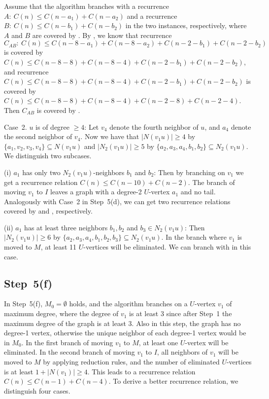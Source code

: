 \documentclass{elsart_TR2}
\begin{document}
Assume that the algorithm branches with
a recurrence $A:~C(n)\leq C(n-a_1)+C(n-a_2)$ and
a recurrence $B:~C(n)\leq C(n-b_1)+C(n-b_2)$ in the two instances, respectively,
where $A$ and $B$ are covered by .
By , we know that
recurrence $C_{AB}:~C(n)\leq C(n-8-a_1)+C(n-8-a_2)+C(n-2-b_1)+C(n-2-b_2)$ is covered by $C(n)\leq C(n-8-8)+C(n-8-4)+C(n-2-b_1)+C(n-2-b_2)$, and
recurrence
$C(n)\leq C(n-8-8)+C(n-8-4)+C(n-2-b_1)+C(n-2-b_2)$ is covered by $C(n)\leq C(n-8-8)+C(n-8-4)+C(n-2-8)+C(n-2-4)$.
Then $C_{AB}$ is covered by .




Case~2. $u$ is of degree $\geq 4$: Let $v_4$ denote the fourth neighbor of $u$,
 and $a_4$ denote the second neighbor of $v_4$.
Now we have that $|N(v_1u)|\geq 4$ by $\{a_1,v_2,v_3,v_4\}\subseteq N(v_1u)$ and $|N_2(v_1u)|\geq 5$
by $\{a_2,a_3,a_4,b_1,b_2\}\subseteq N_2(v_1u)$.
We distinguish two subcases.

(i) $a_1$ has only two $N_2(v_1u)$-neighbors $b_1$ and $b_2$:
Then by branching on $v_1$
we get a recurrence relation $C(n)\leq C(n-10)+C(n-2)$.
The branch of moving $v_1$ to $I$ leaves a graph with a degree-2 $U$-vertex $a_1$ and no tail.
Analogously with Case~2 in Step~5(d),
we can get two recurrence relations covered by  and , respectively.

(ii) $a_1$ has at least three neighbors $b_1,b_2$ and $b_3\in N_2(v_1u)$:
Then $|N_2(v_1u)|\geq 6$ by $\{a_2,a_3,a_4,b_1,b_2,b_3\}\subseteq N_2(v_1u)$.
In the branch where $v_1$ is moved to $M$, at least 11 $U$-vertices will be eliminated.
We can branch with  in this case.

\subsection{Step~5(f)}
In Step~5(f), $M_0=\emptyset$ holds, and
the algorithm branches on a $U$-vertex $v_1$ of maximum degree,
where the degree of $v_1$ is  at least 3 since after Step~1 the maximum degree of the graph is at least 3.
Also in this step, the graph has no degree-1 vertex, otherwise the unique neighbor of each degree-1 vertex would be in $M_0$.
In the first  branch of moving $v_1$ to $M$, at least one $U$-vertex will be eliminated.
In the second branch of moving $v_1$ to $I$, all neighbors of $v_1$ will be moved to $M$ by applying reduction rules, and
the number of eliminated $U$-vertices is at least  $1+|N(v_1)|\geq 4$.
This leads to a recurrence relation $C(n)\leq C(n-1)+C(n-4)$.
To derive a better recurrence relation, we distinguish four cases.
\end{document}
